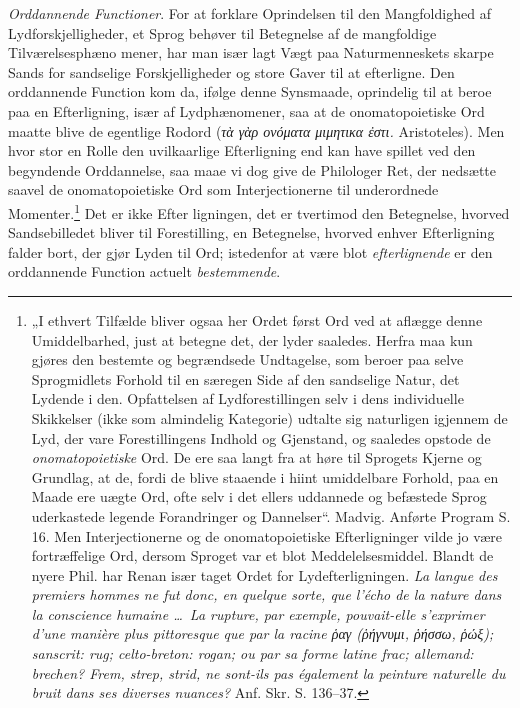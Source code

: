 \documentclass[12pt]{book}
\newcommand{\opage}[1]{\marginnote{\footnotesize\textit{[#1]}}}
\begin{document}
\emph{Orddannende Functioner}. For at forklare Oprindelsen
til den Mangfoldighed af Lydforskjelligheder, et Sprog
behøver til Betegnelse af de mangfoldige Tilværelsesphæno%
\opage{31}mener, har man især lagt Vægt paa Naturmenneskets skarpe
Sands for sandselige Forskjelligheder og store Gaver til at
efterligne. Den orddannende Function kom da, ifølge denne
Synsmaade, oprindelig til at beroe paa en Efterligning,
især af Lydphænomener, saa at de onomatopoietiske Ord
maatte blive de egentlige Rodord (\textit{τὰ γὰρ ονόματα μιμητικα ἐστι.}
Aristoteles). Men hvor stor en Rolle den uvilkaarlige
Efterligning end kan have spillet ved den begyndende
Orddannelse, saa maae vi dog give de Philologer
Ret, der nedsætte saavel de onomatopoietiske Ord som
Interjectionerne til underordnede Momenter.\footnote{%
„I ethvert Tilfælde bliver ogsaa her Ordet først Ord ved at aflægge
denne Umiddelbarhed, just at betegne det, der lyder saaledes.
Herfra maa kun gjøres den bestemte og begrændsede Undtagelse,
som beroer paa selve Sprogmidlets Forhold til en særegen Side
af den sandselige Natur, det Lydende i den. Opfattelsen af
Lydforestillingen selv i dens individuelle Skikkelser (ikke som almindelig
Kategorie) udtalte sig naturligen igjennem de Lyd, der vare
Forestillingens Indhold og Gjenstand, og saaledes opstode de
\emph{onomatopoietiske} Ord. De ere saa langt fra at høre til Sprogets
Kjerne og Grundlag, at de, fordi de blive staaende i hiint
umiddelbare Forhold, paa en Maade ere uægte Ord, ofte selv i det
ellers uddannede og befæstede Sprog uderkastede legende Forandringer
og Dannelser“. Madvig. Anførte Program S. 16. Men
Interjectionerne og de onomatopoietiske Efterligninger vilde jo være
fortræffelige Ord, dersom Sproget var et blot Meddelelsesmiddel. Blandt
de nyere Phil. har Renan især taget Ordet for Lydefterligningen.
\textit{La langue des premiers hommes ne fut donc, en quelque sorte,
que l'écho de la nature dans la conscience humaine \ldots\ La rupture,
par exemple, pouvait-elle s'exprimer d'une manière plus
pittoresque que par la racine ῥαγ (ῥήγνυμι, ῥήσσω, ῥώξ); sanscrit:
\emph{rug}; celto-breton: \emph{rogan}; ou par sa forme latine \emph{frac};
allemand: \emph{brechen}? \emph{Frem}, \emph{strep}, \emph{strid}, ne sont-ils pas
également la peinture naturelle du bruit dans ses diverses nuances?}
Anf. Skr. S. 136--37.} Det er ikke Efter%
\opage{32}ligningen, det er tvertimod den Betegnelse, hvorved
Sandsebilledet bliver til Forestilling, en Betegnelse, hvorved enhver
Efterligning falder bort, der gjør Lyden til Ord; istedenfor
at være blot \emph{efterlignende} er den orddannende Function
actuelt \emph{bestemmende}.
\end{document}
